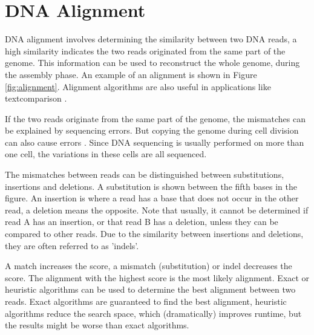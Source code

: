\documentclass[../main/thesis.tex]{subfiles}
\begin{document}

\section{DNA Alignment}
DNA alignment involves determining the similarity between two DNA reads, a high similarity indicates the two reads originated from the same part of the genome.
This information can be used to reconstruct the whole genome, during the assembly phase.
An example of an alignment is shown in Figure \ref{fig:alignment}.
Alignment algorithms are also useful in applications like textcomparison \cite{SW_plagiarism}.


If the two reads originate from the same part of the genome, the mismatches can be explained by sequencing errors.
But copying the genome during cell division can also cause errors \cite{dna_replication_errors}.
Since DNA sequencing is usually performed on more than one cell, the variations in these cells are all sequenced.

The mismatches between reads can be distinguished between substitutions, insertions and deletions.
A substitution is shown between the fifth bases in the figure.
An insertion is where a read has a base that does not occur in the other read, a deletion means the opposite.
Note that usually, it cannot be determined if read A has an insertion, or that read B has a deletion, unless they can be compared to other reads.
Due to the similarity between insertions and deletions, they are often referred to as 'indels'.

A match increases the score, a mismatch (substitution) or indel decreases the score.
The alignment with the highest score is the most likely alignment.
Exact or heuristic algorithms can be used to determine the best alignment between two reads.
Exact algorithms are guaranteed to find the best alignment, heuristic algorithms reduce the search space, which (dramatically) improves runtime, but the results might be worse than exact algorithms.
\end{document}
